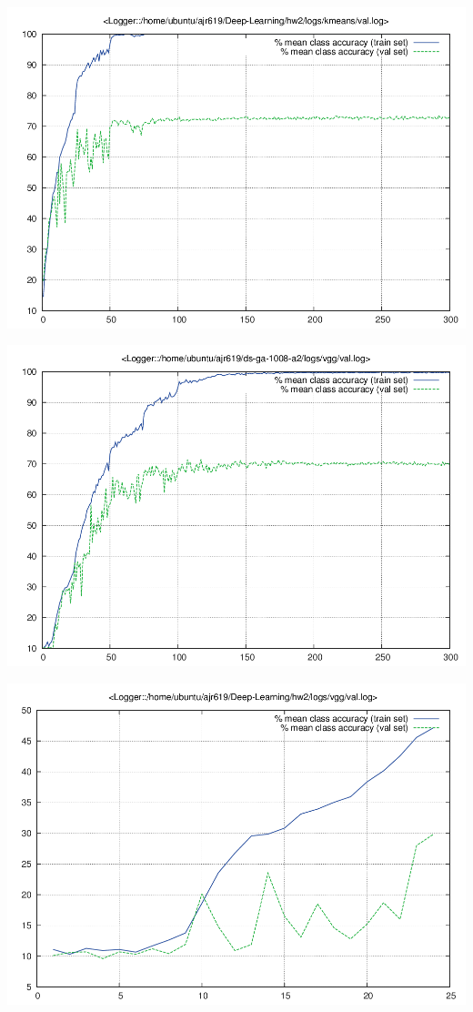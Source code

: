 \documentclass{article}
\begin{document}
\begin{centering}
\includegraphics[scale=0.3]{images/kmeans/val.png}
\end{centering}

\begin{centering}
\includegraphics[scale=0.3]{images/kmeans.1/val.png}
\end{centering}

\begin{centering}
\includegraphics[scale=0.3]{images/vgg/val.png}
\end{centering}
\end{document}
